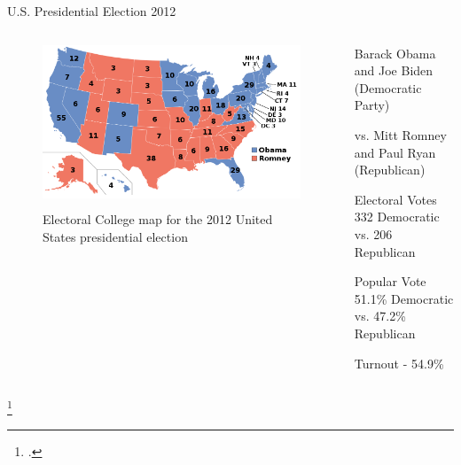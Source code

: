 \documentclass[aspectratio=169,notes]{beamer}
\begin{document}
\begin{frame}{U.S. Presidential Election 2012}
 \begin{columns}
 \begin{column}{0.5\textwidth}
\begin{figure}[p]
 \centering
 \colorbox{white}{\includegraphics[width=\linewidth]{ElectoralCollege2012.png}}
 \captionsetup{justification=centering}
 \caption{Electoral College map for the 2012 United States presidential election\footnotemark}
\end{figure}

\end{column}

\begin{column}{0.5\textwidth}
\alert{Barack Obama} and Joe Biden (Democratic Party)

vs. Mitt Romney and Paul Ryan (Republican)

\begin{block}{Electoral Votes}
 332 Democratic vs. 206 Republican
\end{block}

\begin{block}{Popular Vote}
 51.1\% Democratic vs. 47.2\% Republican
\end{block}

\begin{block}{Turnout - 54.9\%}
\end{block}

\end{column}
\end{columns}
\footcitetext{nytimes_election}
\end{frame}
\end{document}

